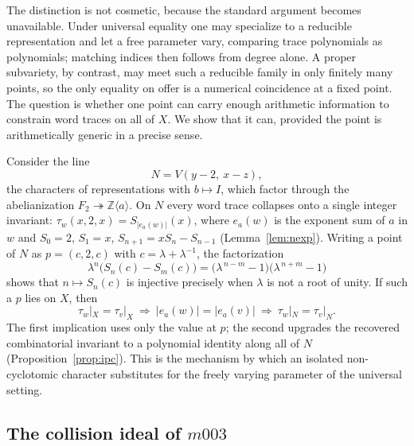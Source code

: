\documentclass[11pt,a4paper]{article}
\theoremstyle{definition}
\theoremstyle{remark}
\newcommand{\Z}{\mathbb{Z}}
\begin{document}
The distinction is not cosmetic, because the standard argument becomes
unavailable. Under universal equality one may specialize to a reducible
representation and let a free parameter vary, comparing trace polynomials
as polynomials; matching indices then follows from degree alone. A proper
subvariety, by contrast, may meet such a reducible family in only finitely
many points, so the only equality on offer is a numerical coincidence at a
fixed point. The question is whether one point can carry enough arithmetic
information to constrain word traces on all of $X$. We show that it can,
provided the point is arithmetically generic in a precise sense.

Consider the line
\begin{equation}
N = V(y-2,\ x-z),
\end{equation}
the characters of representations with $b \mapsto I$, which factor through
the abelianization $F_2 \twoheadrightarrow \Z\langle a\rangle$. On $N$
every word trace collapses onto a single integer invariant:
$\tau_w(x,2,x) = S_{|e_a(w)|}(x)$, where $e_a(w)$ is the exponent sum of
$a$ in $w$ and $S_0 = 2$, $S_1 = x$, $S_{n+1} = xS_n - S_{n-1}$
(Lemma~\ref{lem:nexp}). Writing a point of $N$ as $p = (c,2,c)$ with
$c = \lambda + \lambda^{-1}$, the factorization
\begin{equation}
\lambda^{n}\bigl(S_n(c) - S_m(c)\bigr)
= \bigl(\lambda^{\,n-m} - 1\bigr)\bigl(\lambda^{\,n+m} - 1\bigr)
\end{equation}
shows that $n \mapsto S_n(c)$ is injective precisely when $\lambda$ is not
a root of unity. If such a $p$ lies on $X$, then
\begin{equation}
\tau_w|_X = \tau_v|_X
\ \Longrightarrow\ |e_a(w)| = |e_a(v)|
\ \Longrightarrow\ \tau_w|_N = \tau_v|_N .
\end{equation}
The first implication uses only the value at $p$; the second upgrades the
recovered combinatorial invariant to a polynomial identity along all of
$N$ (Proposition~\ref{prop:ipc}). This is the mechanism by which an
isolated non-cyclotomic character substitutes for the freely varying
parameter of the universal setting.

\subsection{The collision ideal of $m003$}
\end{document}
